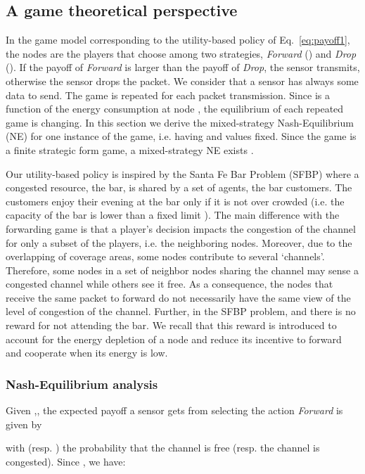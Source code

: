 \documentclass[journal, peerreview, onecolumn, draftcls]{IEEEtran}
\begin{document}
\subsection{A game theoretical perspective}

In the game model corresponding to the utility-based policy of Eq.~\eqref{eq:payoff1}, the nodes are the players that choose among two strategies, {\it Forward} () and {\it Drop} (). If the payoff of {\it Forward} is larger than the payoff of {\it Drop}, the sensor transmits, otherwise the sensor drops the packet. We consider that a sensor has always some data to send. The game is repeated for each packet transmission. Since  is a function of the energy consumption at node , the equilibrium of each repeated game is changing.
In this section we derive the mixed-strategy Nash-Equilibrium (NE) for one instance of the game, i.e. having  and  values fixed. Since the game is a finite strategic form game, a mixed-strategy NE exists \cite{gametheory}.

Our utility-based policy is inspired by the Santa Fe Bar Problem (SFBP)\cite{mishra} where a congested resource, the bar, is shared by a set of agents, the bar customers. The customers enjoy their evening at the bar only if it is not over crowded (i.e. the capacity of the bar is lower than a fixed limit ).
The main difference with the forwarding game is that a player's decision impacts the congestion of the channel for only a subset of the players, i.e. the neighboring nodes. Moreover, due to the overlapping of coverage areas, some nodes contribute to several `channels'. Therefore, some nodes in a set of neighbor nodes sharing the channel may sense a congested channel while others see it free. As a consequence, the nodes that receive the same packet to forward do not necessarily have the same view of the level of congestion of the channel. Further, in the SFBP problem,  and there is no reward for not attending the bar. We recall that this reward is introduced to account for the energy depletion of a node and reduce its incentive to forward and cooperate when its energy is low.

\subsubsection{Nash-Equilibrium analysis}
Given ,, the expected payoff a sensor  gets from selecting the action {\it Forward} is given by

with  (resp. ) the probability that the channel is free (resp. the channel is congested).
Since , we have:
\end{document}
